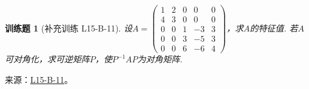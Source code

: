 \documentclass[12pt,fontset=fandol]{ctexart}
\newtheorem{exercise}{训练题}[section]
\begin{document}
\begin{exercise}[补充训练 L15-B-11]\label{prob:L15-B-11}
设$A=\begin{pmatrix}
                1 & 2 & 0 & 0  & 0 \\ 4 & 3 & 0 & 0 & 0 \\ 0 & 0 & 1 & -3 & 3 \\ 0 & 0 & 3 & -5 & 3 \\
                0 & 0 & 6 & -6 & 4
            \end{pmatrix}$，求$A$的特征值. 若$A$可对角化，求可逆矩阵$P$，使$P^{-1}AP$为对角矩阵.
\end{exercise}
\noindent 来源：\href{https://github.com/yhwu-is/Linear-Algebra-Left-Undone/blob/new/%E8%AE%B2%E4%B9%89/%E4%B8%93%E9%A2%98/15%20%E7%9B%B8%E4%BC%BC%E6%A0%87%E5%87%86%E5%BD%A2%EF%BC%9A%E5%A4%8D%E6%95%B0%E5%9F%9F%E4%B8%8A%E7%9A%84%E5%B0%9D%E8%AF%95%E4%B8%8E%E7%90%86%E8%AE%BA.tex}{L15-B-11}。
\end{document}
